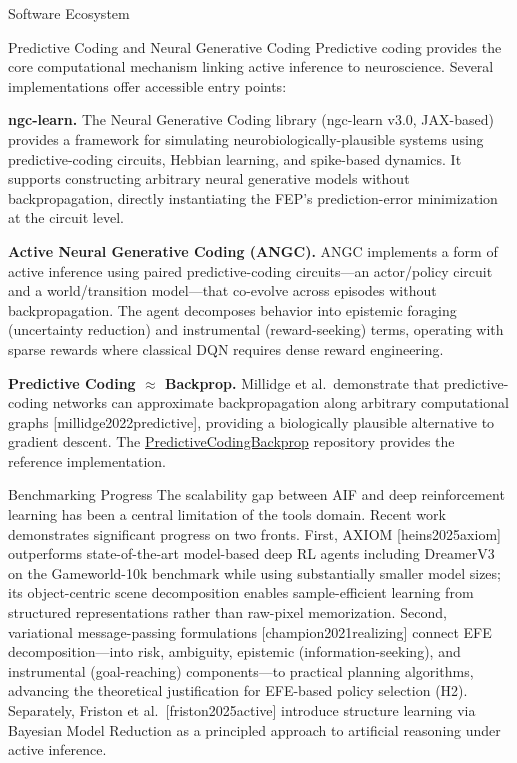 \documentclass[
  ignorenonframetext,
]{beamer}
\providecommand{\citep}[1]{[#1]}
\begin{document}
\begin{frame}{Software Ecosystem}
\begin{block}{Predictive Coding and Neural Generative Coding}
\protect{}\label{predictive-coding-and-neural-generative-coding}
Predictive coding provides the core computational mechanism linking
active inference to neuroscience. Several implementations offer
accessible entry points:

\textbf{ngc-learn.} The Neural Generative Coding library (ngc-learn
v3.0, JAX-based) provides a framework for simulating
neurobiologically-plausible systems using predictive-coding circuits,
Hebbian learning, and spike-based dynamics. It supports constructing
arbitrary neural generative models without backpropagation, directly
instantiating the FEP's prediction-error minimization at the circuit
level.

\textbf{Active Neural Generative Coding (ANGC).} ANGC implements a form
of active inference using paired predictive-coding circuits---an
actor/policy circuit and a world/transition model---that co-evolve
across episodes without backpropagation. The agent decomposes behavior
into epistemic foraging (uncertainty reduction) and instrumental
(reward-seeking) terms, operating with sparse rewards where classical
DQN requires dense reward engineering.

\textbf{Predictive Coding \(\approx\) Backprop.} Millidge et
al.~demonstrate that predictive-coding networks can approximate
backpropagation along arbitrary computational graphs
\citep{millidge2022predictive}, providing a biologically plausible
alternative to gradient descent. The
\href{https://github.com/BerenMillidge/PredictiveCodingBackprop}{PredictiveCodingBackprop}
repository provides the reference implementation.
\end{block}

\begin{block}{Benchmarking Progress}
\protect{}\label{benchmarking-progress}
The scalability gap between AIF and deep reinforcement learning has been
a central limitation of the tools domain. Recent work demonstrates
significant progress on two fronts. First, AXIOM \citep{heins2025axiom}
outperforms state-of-the-art model-based deep RL agents including
DreamerV3 on the Gameworld-10k benchmark while using substantially
smaller model sizes; its object-centric scene decomposition enables
sample-efficient learning from structured representations rather than
raw-pixel memorization. Second, variational message-passing formulations
\citep{champion2021realizing} connect EFE decomposition---into risk,
ambiguity, epistemic (information-seeking), and instrumental
(goal-reaching) components---to practical planning algorithms, advancing
the theoretical justification for EFE-based policy selection (H2).
Separately, Friston et al.~\citep{friston2025active} introduce structure
learning via Bayesian Model Reduction as a principled approach to
artificial reasoning under active inference.


\end{block}
\end{frame}
\end{document}
